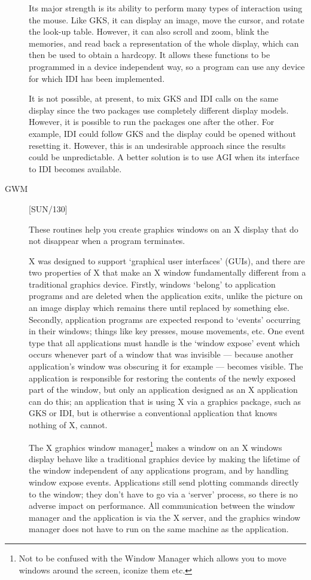 \begin{description}
Its major strength is its ability to perform many types of interaction using the
mouse.
Like GKS, it can display an image, move the cursor, and rotate the look-up
table.
However, it can also scroll and zoom, blink the memories, and read back a
representation of the whole display, which can then be used to obtain a
hardcopy.
It allows these functions to be programmed in a device independent way, so
a program can use any device for which IDI has been implemented.

It is not possible, at present, to mix GKS and IDI calls on the same display
since the two packages use completely different display models.
However, it is possible to run the packages one after the other.
For example, IDI could follow GKS and the display could be opened without
resetting it.
However, this is an undesirable approach since the results could be
unpredictable.
A better solution is to use AGI when its interface to IDI becomes available.

\item [GWM] \hfill [SUN/130]

These routines help you create graphics windows on an X display that do not
disappear when a program terminates.

X was designed to support `graphical user interfaces' (GUIs), and there are two
properties of X that make an X window fundamentally different from a
traditional graphics device.
Firstly, windows `belong' to application programs and are deleted when the
application exits, unlike the picture on an image display which remains there
until replaced by something else. 
Secondly, application programs are expected respond to `events' occurring in
their windows; things like key presses, mouse movements, etc.
One event type that all applications must handle is the `window expose' event
which occurs whenever part of a window that was invisible --- because another
application's window was obscuring it for example --- becomes visible.
The application is responsible for restoring the contents of the newly exposed
part of the window, but only an application designed as an X application can do
this; an application that is using X via a graphics package, such as GKS or IDI,
but is otherwise a conventional application that knows nothing of X, cannot.

The X graphics window manager\footnote{Not to be confused with the Window
Manager which allows you to move windows around the screen, iconize them etc.}
makes a window on an X windows display behave like a traditional graphics
device by making the lifetime of the window independent of any applications
program, and by handling window expose events.
Applications still send plotting commands directly to the window; they don't
have to go via a `server' process, so there is no adverse impact on
performance.
All communication between the window manager and the application is via the X
server, and the graphics window manager does not have to run on the same 
machine as the application.

\end{description}

